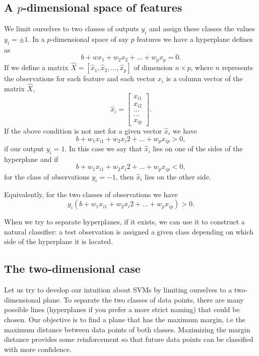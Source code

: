 \documentclass[%
oneside,                 %
final,                   %
10pt]{article}
\begin{document}
\subsection{A $p$-dimensional space of features}

We limit ourselves to two classes of outputs $y_i$ and assign these classes the values $y_i = \pm 1$. 
In a $p$-dimensional space of say $p$ features we have a hyperplane defines as 
\[
b+wx_1+w_2x_2+\dots +w_px_p=0.
\]
If we define a 
matrix $\hat{X}=\left[\hat{x}_1,\hat{x}_2,\dots, \hat{x}_p\right]$
of dimension $n\times p$, where $n$ represents the observations for each feature and each vector $x_i$ is a column vector of the matrix $\hat{X}$, 
\[
\hat{x}_i = \begin{bmatrix} x_{i1} \\ x_{i2} \\ \dots \\ \dots \\ x_{ip} \end{bmatrix}.
\]
If the above condition is not met for a given vector $\hat{x}_i$ we have 
\[
b+w_1x_{i1}+w_2x_{i}2+\dots +w_px_{ip} >0,
\]
if our output $y_i=1$.
In this case we say that $\hat{x}_i$ lies on one of the sides of the hyperplane and if 
\[
b+w_1x_{i1}+w_2x_{i}2+\dots +w_px_{ip} < 0,
\]
for the class of observations $y_i=-1$, 
then $\hat{x}_i$ lies on the other side. 

Equivalently, for the two classes of observations we have 
\[
y_i\left(b+w_1x_{i1}+w_2x_{i}2+\dots +w_px_{ip}\right) > 0. 
\]

When we try to separate hyperplanes, if it exists, we can use it to construct a natural classifier: a test observation is assigned a given class depending on which side of the hyperplane it is located.

\subsection{The two-dimensional case}

Let us try to develop our intuition about SVMs by limiting ourselves to a two-dimensional
plane.  To separate the two classes of data points, there are many
possible lines (hyperplanes if you prefer a more strict naming)  
that could be chosen. Our objective is to find a
plane that has the maximum margin, i.e the maximum distance between
data points of both classes. Maximizing the margin distance provides
some reinforcement so that future data points can be classified with
more confidence.
\end{document}
